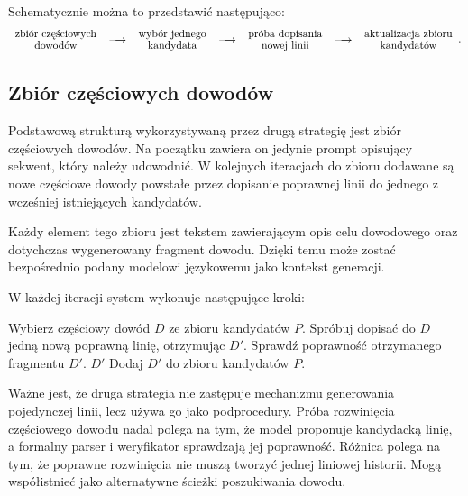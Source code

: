 \documentclass[shortabstract]{iithesis}
\theoremstyle{definition}
\theoremstyle{remark}
\theoremstyle{plain}
\begin{document}
Schematycznie można to przedstawić następująco:
\[
\small
\begin{array}{c}
\text{zbiór częściowych}\\[-0.2ex]
\text{dowodów}
\end{array}
\;\longrightarrow\;
\begin{array}{c}
\text{wybór jednego}\\[-0.2ex]
\text{kandydata}
\end{array}
\;\longrightarrow\;
\begin{array}{c}
\text{próba dopisania}\\[-0.2ex]
\text{nowej linii}
\end{array}
\;\longrightarrow\;
\begin{array}{c}
\text{aktualizacja zbioru}\\[-0.2ex]
\text{kandydatów}
\end{array}.
\]

\subsection{Zbiór częściowych dowodów}

Podstawową strukturą wykorzystywaną przez drugą strategię jest zbiór częściowych
dowodów. Na początku zawiera on jedynie prompt opisujący sekwent, który należy
udowodnić. W kolejnych iteracjach do zbioru dodawane są nowe częściowe dowody
powstałe przez dopisanie poprawnej linii do jednego z wcześniej istniejących
kandydatów.

Każdy element tego zbioru jest tekstem zawierającym opis celu dowodowego oraz
dotychczas wygenerowany fragment dowodu. Dzięki temu może zostać bezpośrednio
podany modelowi językowemu jako kontekst generacji. 

W każdej iteracji system wykonuje następujące kroki:
\begin{algorithm}[H]
\caption{Rozwijanie zbioru częściowych dowodów}
\begin{algorithmic}[1]
\State Wybierz częściowy dowód \(D\) ze zbioru kandydatów \(P\).
\State Spróbuj dopisać do \(D\) jedną nową poprawną linię, otrzymując \(D'\).
\State Sprawdź poprawność otrzymanego fragmentu \(D'\).
    \State \Return \(D'\)
    \State Dodaj \(D'\) do zbioru kandydatów \(P\).
\EndIf
\end{algorithmic}
\end{algorithm}

Ważne jest, że druga strategia nie zastępuje mechanizmu generowania pojedynczej
linii, lecz używa go jako podprocedury. Próba rozwinięcia częściowego dowodu nadal
polega na tym, że model proponuje kandydacką linię, a formalny parser i weryfikator
sprawdzają jej poprawność. Różnica polega na tym, że poprawne rozwinięcia nie
muszą tworzyć jednej liniowej historii. Mogą współistnieć jako alternatywne ścieżki
poszukiwania dowodu.
\end{document}
